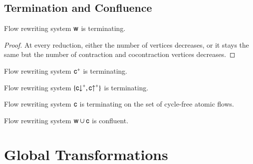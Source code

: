\subsection{Termination and Confluence}
\begin{theorem}\label{TheoWTerm}
Flow rewriting system\/ ${\mathsf w}$ is terminating.
\end{theorem}

\begin{proof}
At every reduction, either the number of vertices decreases, or it stays the same but the number of contraction and cocontraction vertices decreases.
\end{proof}

\begin{theorem}\label{TheoCPTerm}
Flow rewriting system\/ $\frcp$ is terminating.
\end{theorem}

\begin{theorem}\label{TheoCdPCuPTerm}
Flow rewriting system\/ $\{\rcd^\ppl,\rcu^\ppl\}$ is terminating.
\end{theorem}

\begin{theorem}\label{TheoCTerm}
Flow rewriting system\/ ${\mathsf c}$ is terminating on the set of cycle-free atomic flows.
\end{theorem}

\begin{theorem}\label{TheoWCConf}
Flow rewriting system\/ ${\mathsf w}\cup{\mathsf c}$ is confluent.
\end{theorem}

\section{Global Transformations}

